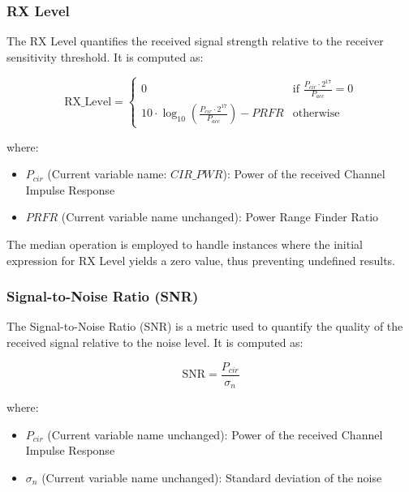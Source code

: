 \documentclass[
	article, %
	11pt, %
]{CSUniSchoolLabReport}
\begin{document}
\subsubsection{RX Level}\label{rx_level}

The RX Level quantifies the received signal strength relative to the receiver sensitivity threshold. It is computed as:

\begin{equation}
  \text{RX\_Level} =
  \begin{cases}
    0 & \text{if } \frac{P_{cir} \cdot 2^{17}}{P_{acc}} = 0 \\
    10 \cdot \log_{10} \left( \frac{P_{cir} \cdot 2^{17}}{P_{acc}} \right) - PRFR & \text{otherwise}
  \end{cases}
\end{equation}

where:

\begin{itemize}
  \item $P_{cir}$ (Current variable name: $CIR\_PWR$): Power of the received Channel Impulse Response
  \item $PRFR$ (Current variable name unchanged): Power Range Finder Ratio
\end{itemize}

The median operation is employed to handle instances where the initial expression for RX Level yields a zero value, thus preventing undefined results.

\subsubsection{Signal-to-Noise Ratio (SNR)}\label{snr}

The Signal-to-Noise Ratio (SNR) is a metric used to quantify the quality of the received signal relative to the noise level. It is computed as:

\begin{equation}
  \text{SNR} = \frac{P_{cir}}{\sigma_n}
\end{equation}

where:

\begin{itemize}
  \item $P_{cir}$ (Current variable name unchanged): Power of the received Channel Impulse Response
  \item $\sigma_n$ (Current variable name unchanged): Standard deviation of the noise
\end{itemize}
\end{document}
